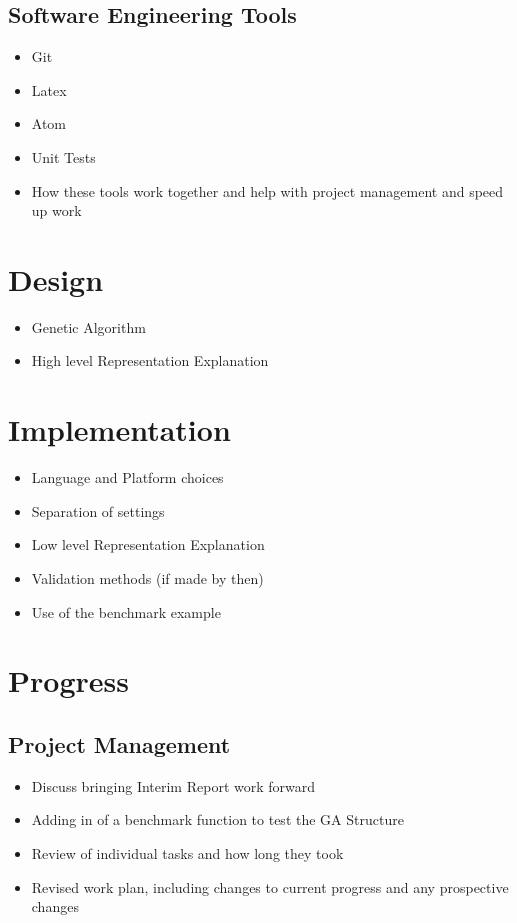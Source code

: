 \documentclass[a4paper]{article}
\begin{document}
\subsection{Software Engineering Tools}
\begin{itemize}
    \item Git
    \item Latex
    \item Atom
    \item Unit Tests
    \item How these tools work together and help with project management and speed up work
\end{itemize}

\section{Design}
\begin{itemize}
    \item Genetic Algorithm
    \item High level Representation Explanation
\end{itemize}

\section{Implementation}
\begin{itemize}
    \item Language and Platform choices
    \item Separation of settings
    \item Low level Representation Explanation
    \item Validation methods (if made by then)
    \item Use of the benchmark example
\end{itemize}

\section{Progress}
\subsection{Project Management}
\begin{itemize}
    \item Discuss bringing Interim Report work forward
    \item Adding in of a benchmark function to test the GA Structure
    \item Review of individual tasks and how long they took
    \item Revised work plan, including changes to current progress and any prospective changes
\end{itemize}
\end{document}
